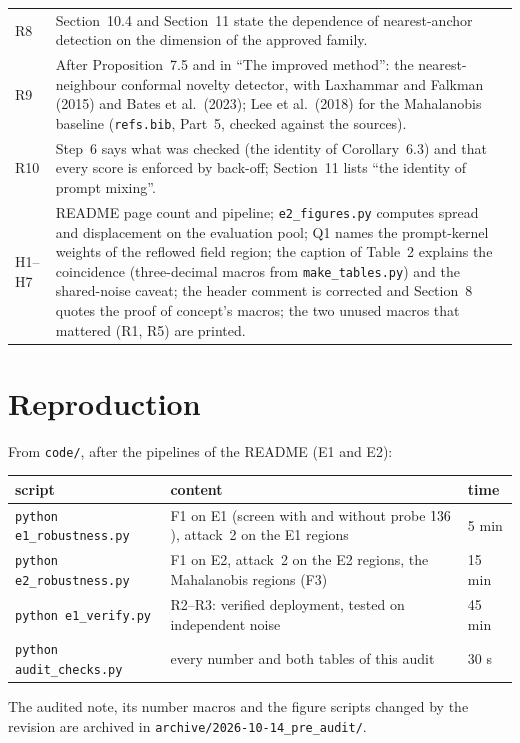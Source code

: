 \documentclass[11pt]{article}
\newcommand{\file}[1]{\texttt{#1}}
\begin{document}
\begin{longtable}{@{}p{1.0cm}>{\raggedright\arraybackslash}p{15.2cm}@{}}
R8 & Section~10.4 and Section~11 state the dependence of nearest-anchor detection on the dimension of the approved family.\\
R9 & After Proposition~7.5 and in ``The improved method'': the nearest-neighbour conformal novelty detector, with Laxhammar and Falkman
(2015) and Bates et al.\ (2023); Lee et al.\ (2018) for the Mahalanobis baseline (\file{refs.bib}, Part~5, checked against the sources).\\
R10 & Step~6 says what was checked (the identity of Corollary~6.3) and that every score is enforced by back-off; Section~11 lists
``the identity of prompt mixing''.\\
H1--H7 & README page count and pipeline; \file{e2\_figures.py} computes spread and displacement on the evaluation pool; Q1 names the
prompt-kernel weights of the reflowed field region; the caption of Table~2 explains the coincidence (three-decimal macros from
\file{make\_tables.py}) and the shared-noise caveat; the header comment is corrected and Section~8 quotes the proof of concept's
macros; the two unused macros that mattered (R1, R5) are printed.\\
\bottomrule
\end{longtable}

\section{Reproduction}\label{sec:repro}
From \file{code/}, after the pipelines of the README (E1 and E2):
\begin{center}\small
\begin{tabular}{l>{\raggedright\arraybackslash}p{9.2cm}l}
\toprule
script & content & time\\
\midrule
\file{python e1\_robustness.py} & F1 on E1 (screen with and without probe $136$), attack~2 on the E1 regions & 5 min\\
\file{python e2\_robustness.py} & F1 on E2, attack~2 on the E2 regions, the Mahalanobis regions (F3) & 15 min\\
\file{python e1\_verify.py} & R2--R3: verified deployment, tested on independent noise & 45 min\\
\file{python audit\_checks.py} & every number and both tables of this audit & 30 s\\
\bottomrule
\end{tabular}
\end{center}
The audited note, its number macros and the figure scripts changed by the revision are archived in
\file{archive/2026-10-14\_pre\_audit/}.
\end{document}
